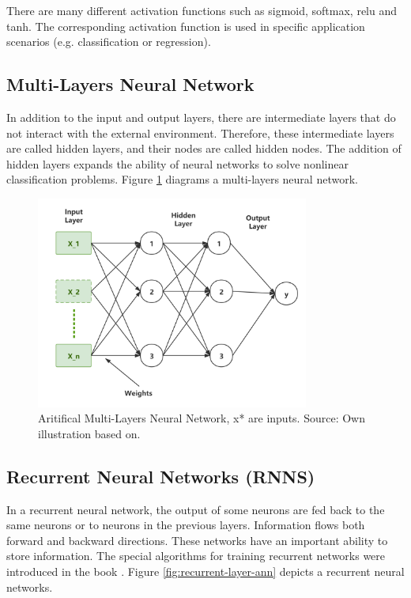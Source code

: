There are many different activation functions such as sigmoid, softmax, relu and tanh. The corresponding activation function is used in specific application scenarios (e.g. classification or regression).

\subsection{Multi-Layers Neural Network}
In addition to the input and output layers, there are intermediate layers that do not interact with the external environment. Therefore, these intermediate layers are called hidden layers, and their nodes are called hidden nodes. The addition of hidden layers expands the ability of neural networks to solve nonlinear classification problems\parencite{BASHEER20003}. Figure \ref{fig:multi-layer-ann} diagrams a multi-layers neural network.

\begin{figure}[htbp]
\centering
\includegraphics[width=0.8\textwidth]{./images/multi-layer-ann.png}
\caption{Aritifical Multi-Layers Neural Network, x* are inputs. Source: Own illustration based
on\parencite{SAIRAMYA2019253}.}
\label{fig:multi-layer-ann}
\end{figure}

\subsection{Recurrent Neural Networks (RNNS)}
In a recurrent neural network, the output of some neurons are fed back to the same neurons or to neurons in the previous layers\parencite{BASHEER20003}. Information flows both forward and backward directions. These networks have an important ability to store information. The special algorithms for training recurrent networks were introduced in the book \parencite{Hassoun1995}. Figure \ref{fig:recurrent-layer-ann} depicts a recurrent neural networks.

